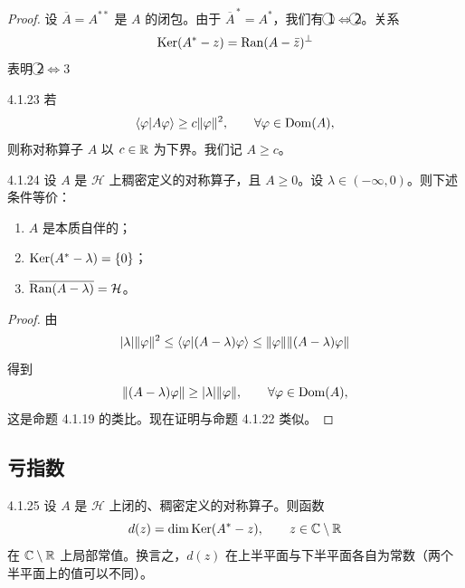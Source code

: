 \begin{proof}
  设 $\overline{A}=A^{**}$ 是 $A$ 的闭包。由于 $\overline{A}^{\,*}=A^*$，我们有 \textcircled{\small 1}$\Longleftrightarrow$\textcircled{\small 2}。关系
  \[
  \operatorname{Ker}(A^*-z)=\operatorname{Ran}(A-\bar z)^\perp
  \]
  表明 \textcircled{\small 2}$\Longleftrightarrow$\textcircled{\small 3}。
\end{proof}

\begin{definition}{4.1.23}
  若
  \[
  \langle \varphi|A\varphi\rangle\ge c\lVert \varphi\rVert^2,\qquad\forall\varphi\in\operatorname{Dom}(A),
  \]
  则称对称算子 $A$ 以 $c\in\mathbb{R}$ 为下界。我们记 $A\ge c$。
\end{definition}

\begin{proposition}{4.1.24}
  设 $A$ 是 $\mathcal{H}$ 上稠密定义的对称算子，且 $A\ge 0$。设 $\lambda\in(-\infty,0)$。则下述条件等价：
  \begin{enumerate}[label=\textcircled{\small\arabic*},leftmargin=2.6em,itemsep=2pt]
    \item $A$ 是本质自伴的；
    \item $\operatorname{Ker}(A^*-\lambda)=\{0\}$；
    \item $\overline{\operatorname{Ran}(A-\lambda)}=\mathcal{H}$。
  \end{enumerate}
\end{proposition}

\begin{proof}
  由
  \[
  \lvert \lambda\rvert\lVert \varphi\rVert^2\le\langle \varphi|(A-\lambda)\varphi\rangle
  \le\lVert \varphi\rVert\lVert (A-\lambda)\varphi\rVert
  \]
  得到
  \[
  \lVert (A-\lambda)\varphi\rVert\ge\lvert \lambda\rvert\lVert \varphi\rVert,\qquad\forall\varphi\in\operatorname{Dom}(A),
  \]
  这是命题 4.1.19 的类比。现在证明与命题 4.1.22 类似。
\end{proof}

\subsection{亏指数}

\begin{proposition}{4.1.25}
  设 $A$ 是 $\mathcal{H}$ 上闭的、稠密定义的对称算子。则函数
  \[
  d(z)=\dim\operatorname{Ker}(A^*-z),\qquad z\in\mathbb{C}\setminus\mathbb{R}
  \]
  在 $\mathbb{C}\setminus\mathbb{R}$ 上局部常值。换言之，$d(z)$ 在上半平面与下半平面各自为常数（两个半平面上的值可以不同）。
\end{proposition}

